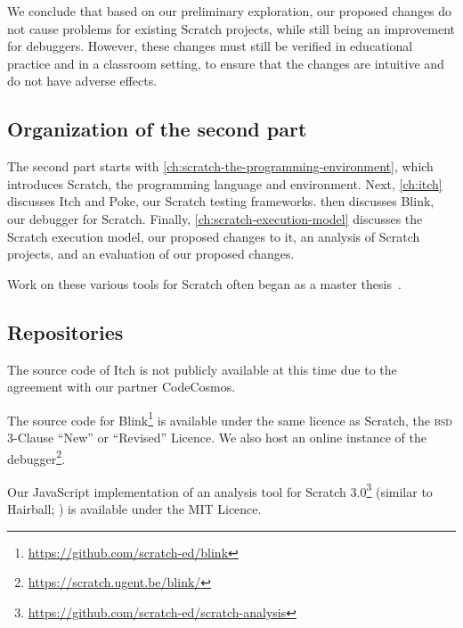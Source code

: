 \documentclass[../main]{subfiles}
\begin{document}
We conclude that based on our preliminary exploration, our proposed changes do not cause problems for existing Scratch projects, while still being an improvement for debuggers.
However, these changes must still be verified in educational practice and in a classroom setting, to ensure that the changes are intuitive and do not have adverse effects.

\subsection{Organization of the second part}\label{subsec:organization-of-the-second-part}

The second part starts with \cref{ch:scratch-the-programming-environment}, which introduces Scratch, the programming language and environment.
Next, \cref{ch:itch} discusses Itch and Poke, our Scratch testing frameworks.
 then discusses Blink, our debugger for Scratch.
Finally, \cref{ch:scratch-execution-model} discusses the Scratch execution model, our proposed changes to it, an analysis of Scratch projects, and an evaluation of our proposed changes.

Work on these various tools for Scratch often began as a master thesis~\autocite{makItchEenEducatief2019,voetenEenBlokgebaseerdTestframework2023,goethalsEenTimeTravelling2023,deproftBlinkEenEducatieve2022}.

\subsection{Repositories}\label{subsec:repositories-and-code-scratch}

The source code of Itch is not publicly available at this time due to the agreement with our partner CodeCosmos.

The source code for Blink\footnote{\url{https://github.com/scratch-ed/blink}} is available under the same licence as Scratch, the \textsc{bsd} 3-Clause ``New'' or ``Revised'' Licence.
We also host an online instance of the debugger\footnote{\url{https://scratch.ugent.be/blink/}}.

Our JavaScript implementation of an analysis tool for Scratch 3.0\footnote{\url{https://github.com/scratch-ed/scratch-analysis}} (similar to Hairball; \cite{boeHairballLintinspiredStatic2013}) is available under the MIT Licence.
\end{document}
